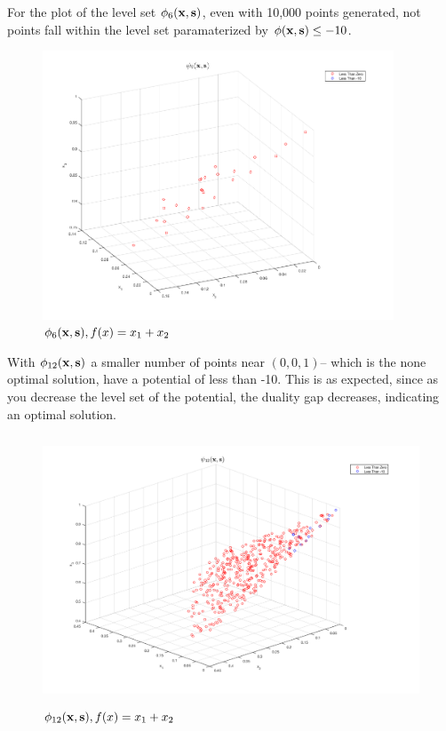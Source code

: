 \documentclass[answers]{exam}
\newcommand\x{{\bf x}}
\newcommand\s{{\bf s}}
\begin{document}
\begin{framed}
For the plot of the level set $\phi_6(\x,\s)$, even with 10,000 points generated, not points fall within the level set paramaterized by $\phi(\x,\s) \leq -10$. 
    \begin{figure}[H]
    \centering
    \caption{ $\phi_6(\x, \s), f(x) = x_1 + x_2$}
    \includegraphics[width=\linewidth, height=8cm]{TF6.png}
    \end{figure}

\newpage
With $\phi_{12}(\x,\s)$ a smaller number of points near $(0,0,1)$-- which is the none optimal solution, have a potential of less than -10. This is as expected, since as you decrease the level set of the potential, the duality gap decreases, indicating an optimal solution. 
    \begin{figure}[H]
    \centering
    \caption{ $\phi_{12}(\x, \s), f(x) = x_1 + x_2$}
    \includegraphics[width=\linewidth, height=8cm]{TF12.png}
    \end{figure} 
    

\end{framed}
\end{document}
